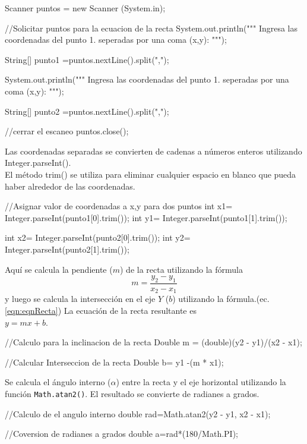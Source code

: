 \begin{javaCode}

Scanner puntos = new Scanner (System.in);
        
    //Solicitar puntos para la ecuacion de la recta  
    System.out.println("""
                        Ingresa las coordenadas del punto 1.
                        seperadas por una coma (x,y):
                           """);
    
    String[] punto1 =puntos.nextLine().split(",");
        
    System.out.println("""
                        Ingresa las coordenadas del punto 1.
                        seperadas por una coma (x,y):
                        """);
    
    String[] punto2 =puntos.nextLine().split(",");
        
    //cerrar el escaneo
    puntos.close();
        
\end{javaCode}

Las coordenadas separadas se convierten de cadenas a números enteros utilizando Integer.parseInt(). \\
El método trim() se utiliza para eliminar cualquier espacio en blanco que pueda haber alrededor de las coordenadas.

\begin{javaCode}
    //Asignar valor de coordenadas a x,y para dos puntos
    int x1= Integer.parseInt(punto1[0].trim());
    int y1= Integer.parseInt(punto1[1].trim());
    
    int x2= Integer.parseInt(punto2[0].trim());
    int y2= Integer.parseInt(punto2[1].trim());
\end{javaCode}

Aquí se calcula la pendiente ($m$) de la recta utilizando la fórmula
\[
m = \frac{{y_2 - y_1}}{{x_2 - x_1}}
\]
y luego se calcula la intersección en el eje $Y$ ($b$) utilizando la fórmula.(ec. \ref{eqn:eqnRecta})
La ecuación de la recta resultante es\\ $y = mx + b$.

\begin{javaCode}
    //Calculo para la inclinacion de la recta  
    Double m = (double)(y2 - y1)/(x2 - x1);
       
    //Calcular Interseccion de la recta
    Double b= y1 -(m * x1);
\end{javaCode}
Se calcula el ángulo interno (\(\alpha\)) entre la recta y el eje horizontal utilizando la función \texttt{Math.atan2()}. El resultado se convierte de radianes a grados.
\begin{javaCode}
        //Calculo de el angulo interno
        double rad=Math.atan2(y2 - y1, x2 - x1);
        
        //Coversion de radianes a grados
        double a=rad*(180/Math.PI);
        
\end{javaCode}


